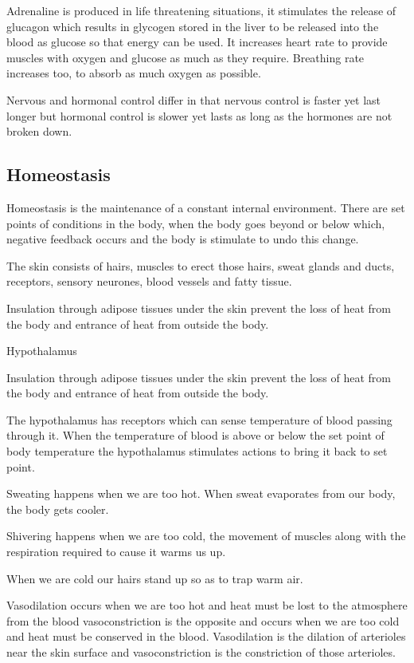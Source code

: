 Adrenaline is produced in life threatening situations, it stimulates the release of glucagon
which results in glycogen stored in the liver to be released into the blood as glucose so that 
energy can be used. It increases heart rate to provide muscles with oxygen and glucose as much as
they require. Breathing rate increases too, to absorb as much oxygen as possible.

Nervous and hormonal control differ in that nervous control is faster yet last longer but hormonal
control is slower yet lasts as long as the hormones are not broken down.

\subsection{Homeostasis}
Homeostasis is the maintenance of a constant internal environment. There are set points of 
conditions in the body, when the body goes beyond or below which, negative feedback occurs and the
body is stimulate to undo this change.

The skin consists of hairs, muscles to erect those hairs, sweat glands and ducts, receptors, 
sensory neurones, blood vessels and fatty tissue.

Insulation through adipose tissues under the skin prevent the loss of heat from the body and
entrance of heat from outside the body.

Hypothalamus

Insulation through adipose tissues under the skin prevent the loss of heat from the body and
entrance of heat from outside the body.

The hypothalamus has receptors which can sense temperature of blood passing through it. When the
temperature of blood is above or below the set point of body temperature the hypothalamus 
stimulates actions to bring it back to set point.

Sweating happens when we are too hot. When sweat evaporates from our body, the body gets cooler.

Shivering happens when we are too cold, the movement of muscles along with the respiration required
to cause it warms us up.

When we are cold our hairs stand up so as to trap warm air.

Vasodilation occurs when we are too hot and heat must be lost to the atmosphere from the blood
vasoconstriction is the opposite and occurs when we are too cold and heat must be conserved in the
blood. Vasodilation is the dilation of arterioles near the skin surface and vasoconstriction is
the constriction of those arterioles.

